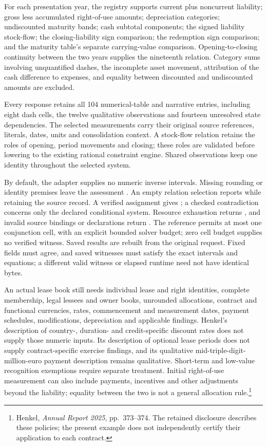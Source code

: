 For each presentation year, the registry supports current plus noncurrent
liability; gross less accumulated right-of-use amounts; depreciation categories;
undiscounted maturity bands; cash subtotal components; the signed liability
stock-flow; the closing-liability sign comparison; the redemption sign
comparison; and the maturity table's separate carrying-value comparison.
Opening-to-closing continuity between the two years supplies the nineteenth
relation. Category sums involving unquantified dashes, the incomplete asset
movement, attribution of the cash difference to expenses, and equality between
discounted and undiscounted amounts are excluded.

Every response retains all 104 numerical-table and narrative entries, including
eight dash cells, the twelve qualitative observations and fourteen unresolved
state dependencies. The selected measurements carry their original source
references, literals, dates, units and consolidation context. A stock-flow
relation retains the roles of opening, period movements and closing; these
roles are validated before lowering to the existing rational constraint engine.
Shared observations keep one identity throughout the selected system.

By default, the adapter supplies no numeric inverse intervals. Missing rounding
or identity premises leave the assessment . An empty relation
selection reports  while retaining the source record.
A verified assignment gives ; a checked
contradiction concerns only the declared conditional system. Resource exhaustion
returns , and invalid source bindings or declarations return
. The reference permits at most one conjunction cell, with an
explicit bounded solver budget; zero cell budget supplies no verified witness.
Saved results are rebuilt from the original request. Fixed fields must agree,
and saved witnesses must satisfy the exact intervals and equations; a different
valid witness or elapsed runtime need not have identical bytes.

An actual lease book still needs individual lease and right identities, complete
membership, legal lessees and owner books, unrounded allocations, contract and
functional currencies, rates, commencement and measurement dates, payment
schedules, modifications, depreciation and applicable findings. Henkel's
description of country-, duration- and credit-specific discount rates does not
supply those numeric inputs. Its description of optional lease periods does
not supply contract-specific exercise findings, and its qualitative
mid-triple-digit-million-euro payment description remains qualitative.
Short-term and low-value recognition exemptions require separate treatment.
Initial right-of-use measurement can also include payments, incentives and
other adjustments beyond the liability; equality between the two is not a
general allocation rule.\footnote{Henkel, \emph{Annual Report 2025},
pp.~373--374. The retained disclosure describes these policies; the present
example does not independently certify their application to each contract.}

